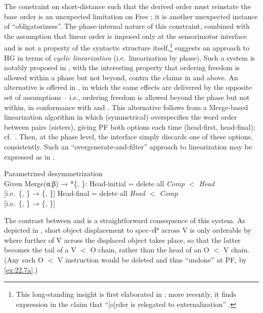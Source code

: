 \documentclass[output=paper]{langsci/langscibook}
\begin{document}
The constraint on short-distance  such that the derived order must
reinstate the base order is an unexpected limitation on Free ; it is
another unexpected instance of \enquote{obligatoriness}. The phase-internal nature of
this constraint, combined with the assumption that linear order is imposed only
at the sensorimotor interface and is not a property of the syntactic structure
itself,\footnote{This long-standing insight is first elaborated in
    \textcite[334--340]{Chomsky1995}; more recently, it finds expression in the
    claim that \enquote{[o]rder is relegated to externalization}
\citep[4]{Chomsky2015}.} suggests an approach to \gls{HG} in terms of \emph{cyclic}
\emph{linearization} (i.e.\ linearization by phase). Such a system is notably
proposed in \citet{FoxPes2005}, with the interesting property that
ordering freedom is allowed within a phase but not beyond, contra the claims in
 and  above. An alternative is offered in
\textcite{Richards2004,Richards2007b}, in which the same effects are delivered
by the opposite set of assumptions -- i.e., ordering freedom is allowed beyond
the phase but not within, in conformance with  and
. This alternative follows from a Merge-based linearization
algorithm in which (symmetrical)  overspecifies the word order
between  pairs (sisters), giving \gls{PF} both options each time
(head-first, head-final); cf.\ \citealt{EpsGroKawKit1998}.  Then, at the
phase level, the interface simply discards one of these options,
consistently. Such an \enquote{overgenerate-and-filter} approach to
linearization may be expressed as in .

\ea\label{ex:22.7}Parametrized desymmetrization\\
    Given Merge(α,β) → *\{, \}:
    \ea\label{ex:22.7a} Head-initial = delete all \emph{Comp $<$ Head}\\
    {}[i.e.\ \{, \} → \{, \sout{}\}]
    \ex\label{ex:22.7b} Head-final = delete all \emph{Head $<$ Comp}\\
    {}[i.e.\ \{, \} → \{\sout{}, \}]
    \z
\z

The contrast between  and  is a
straightforward consequence of this system. As depicted in ,
short object displacement to spec-\emph{v}P across V is only orderable by
 where further  of V across the displaced object
takes place, so that the latter becomes the tail of a V $<$ O chain, rather
than the head of an O $<$ V chain. (Any such O $<$ V instruction would be
deleted and thus \enquote{undone} at \gls{PF}, by
\ref{ex:22.7a}.)\largerpage[1.75]
\end{document}

